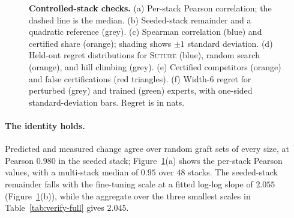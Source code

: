 \documentclass{article}
\theoremstyle{plain}
\theoremstyle{definition}
\theoremstyle{remark}
\begin{document}
\begin{figure}[t]
\centering
\resizebox{\textwidth}{!}{}
\caption{\textbf{Controlled-stack checks.} (a) Per-stack Pearson correlation;
the dashed line is the median. (b) Seeded-stack remainder and a quadratic
reference (grey). (c) Spearman correlation (blue) and certified share (orange);
shading shows $\pm1$ standard deviation. (d) Held-out regret distributions for
\textsc{Suture} (blue), random search (orange), and hill climbing (grey).
(e) Certified competitors (orange) and false certifications (red triangles).
(f) Width-$6$ regret for perturbed (grey) and trained (green) experts, with
one-sided standard-deviation bars. Regret is in nats.}
\label{fig:verify}
\end{figure}

\paragraph{The identity holds.}
Predicted and measured change agree over random graft sets of every size, at
Pearson $0.980$ in the seeded stack; Figure~\ref{fig:verify}(a) shows the
per-stack Pearson values, with a multi-stack median of $0.95$ over $48$ stacks.
The seeded-stack remainder falls with the fine-tuning scale at a fitted log-log slope of
$2.055$ (Figure~\ref{fig:verify}(b)), while the aggregate over the three
smallest scales in Table~\ref{tab:verify-full} gives $2.045$.
\end{document}
